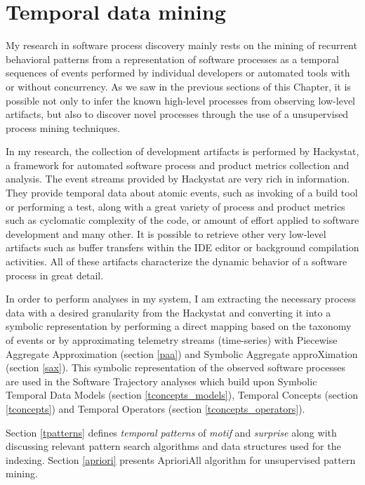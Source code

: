 \section{Temporal data mining} \label{methods}
My research in software process discovery mainly rests on the mining of recurrent behavioral patterns from a representation of software processes as a temporal sequences of events performed by individual developers or automated tools with or without concurrency. As we saw in the previous sections of this Chapter, it is possible not only to infer the known high-level processes from observing low-level artifacts, but also to discover novel processes through the use of a unsupervised process mining techniques.

In my research, the collection of development artifacts is performed by Hackystat, a framework for automated software process and product metrics collection and analysis. The event streams provided by Hackystat are very rich in information. They provide temporal data about atomic events, such as invoking of a build tool or performing a test, along with a great variety of process and product metrics such as cyclomatic complexity of the code, or amount of effort applied to software development and many other. It is possible to retrieve other very low-level artifacts such as buffer transfers within the IDE editor or background compilation activities. All of these artifacts characterize the dynamic behavior of a software process in great detail.

In order to perform analyses in my system, I am extracting the necessary process data with a desired granularity from the Hackystat and converting it into a symbolic representation by performing a direct mapping based on the taxonomy of events or by approximating telemetry streams (time-series) with Piecewise Aggregate Approximation (section \ref{paa}) and Symbolic Aggregate approXimation (section \ref{sax}). This symbolic representation of the observed software processes are used in the Software Trajectory analyses which build upon Symbolic Temporal Data Models (section \ref{tconcepts_models}), Temporal Concepts (section \ref{tconcepts}) and Temporal Operators (section \ref{tconcepts_operators}). 

Section \ref{tpatterns} defines \textit{temporal patterns} of \textit{motif} and \textit{surprise} along with discussing relevant pattern search algorithms and data structures used for the indexing. Section \ref{apriori} presents AprioriAll algorithm for unsupervised pattern mining.